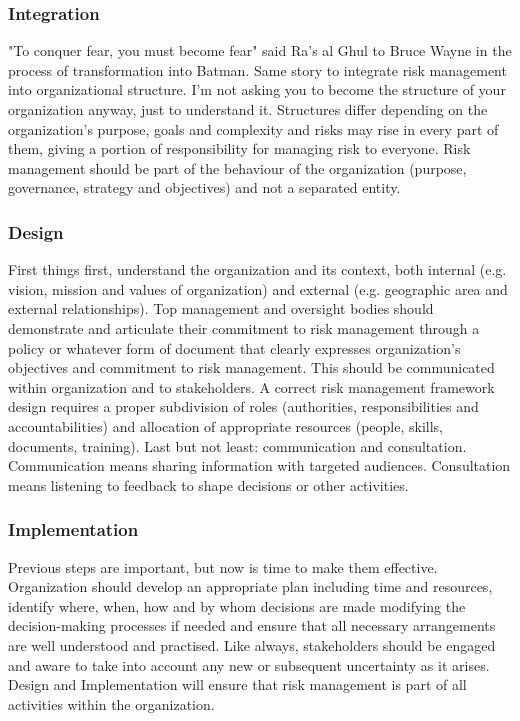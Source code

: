\subsubsection{Integration}
"To conquer fear, you must become fear" said Ra's al Ghul to Bruce Wayne in the process of transformation into Batman. Same story to integrate risk management into organizational structure. I'm not asking you to become the structure of your organization anyway, just to understand it. Structures differ depending on the organization's purpose, goals and complexity and risks may rise in every part of them, giving a portion of responsibility for managing risk to everyone. Risk management should be part of the behaviour of the organization (purpose, governance, strategy and objectives) and not a separated entity.
\subsubsection{Design}
First things first, understand the organization and its context, both internal (e.g. vision, mission and values of organization) and external (e.g. geographic area and external relationships).\newline
Top management and oversight bodies should demonstrate and articulate their commitment to risk management through a policy or whatever form of document that clearly expresses organization's objectives and commitment to risk management. This should be communicated within organization and to stakeholders.\newline
A correct risk management framework design requires a proper subdivision of roles (authorities, responsibilities and accountabilities) and allocation of appropriate resources (people, skills, documents, training).\newline
Last but not least: communication and consultation. Communication means sharing information with targeted audiences. Consultation means listening to feedback to shape decisions or other activities.
\subsubsection{Implementation}
Previous steps are important, but now is time to make them effective. Organization should develop an appropriate plan including time and resources, identify where, when, how and by whom decisions are made modifying the decision-making processes if needed and ensure that all necessary arrangements are well understood and practised. Like always, stakeholders should be engaged and aware to take into account any new or subsequent uncertainty as it arises.\newline
Design and Implementation will ensure that risk management is part of all activities within the organization.
